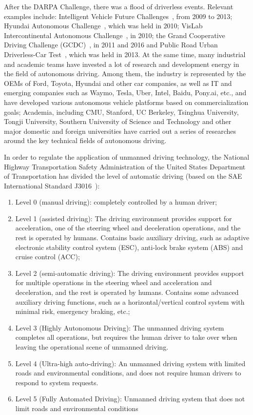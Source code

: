 \documentclass[conference]{IEEEtran}
\begin{document}
After the DARPA Challenge, there was a flood of driverless events. Relevant examples include: Intelligent Vehicle Future Challenges~\cite{xin2014china}, from 2009 to 2013; Hyundai Autonomous Challenge~\cite{Cerri2011}, which was held in 2010; VisLab Intercontinental Autonomous Challenge~\cite{broggi2012vislab}, in 2010; the Grand Cooperative Driving Challenge (GCDC)~\cite{Englund2016}, in 2011 and 2016 and Public Road Urban Driverless-Car Test~\cite{Broggi2015}, which was held in 2013. At the same time, many industrial and academic teams have invested a lot of research and development energy in the field of autonomous driving. Among them, the industry is represented by the OEMs of Ford, Toyota, Hyundai and other car companies, as well as IT and emerging companies such as Waymo, Tesla, Uber, Intel, Baidu, Pony.ai, etc., and have developed various autonomous vehicle platforms based on commercialization goals; Academia, including CMU, Stanford, UC Berkeley, Tsinghua University, Tongji University, Southern University of Science and Technology and other major domestic and foreign universities have carried out a series of researches around the key technical fields of autonomous driving.

In order to regulate the application of unmanned driving technology, the National Highway Transportation Safety Administration of the United States Department of Transportation has divided the level of automatic driving (based on the SAE International Standard J3016~\cite{sae2018taxonomy}):
\begin{enumerate}
	\item Level 0 (manual driving): completely controlled by a human driver;
	\item Level 1 (assisted driving): The driving environment provides support for acceleration,  one of the steering wheel and deceleration operations, and the rest is operated by humans. Contains basic auxiliary driving, such as adaptive electronic stability control system (ESC), anti-lock brake system (ABS) and cruise control (ACC);
	\item Level 2 (semi-automatic driving): The driving environment provides support for multiple operations in the steering wheel and acceleration and deceleration, and the rest is operated by humans.  Contains some advanced auxiliary driving functions, such as a horizontal/vertical control system with minimal risk, emergency braking, etc.;
	\item Level 3 (Highly Autonomous Driving): The unmanned driving system completes all operations, but requires the human driver to take over when leaving the operational scene of unmanned driving.
	\item Level 4 (Ultra-high auto-driving): An unmanned driving system with limited roads and environmental conditions, and does not require human drivers to respond to system requests.
	\item Level 5 (Fully Automated Driving): Unmanned driving system that does not limit roads and environmental conditions
\end{enumerate}
\end{document}
